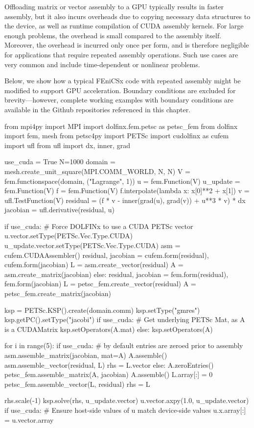 
Offloading matrix or vector assembly to a GPU typically results in faster assembly, but it also incurs overheads due to copying necessary data structures to the device, as well as runtime compilation of CUDA assembly kernels. For large enough problems, the overhead is small compared to the assembly itself. Moreover, the overhead is incurred only once per form, and is therefore negligible for applications that require repeated assembly operations. Such use cases are very common and include time-dependent or nonlinear problems.

Below, we show how a typical FEniCSx code with repeated assembly might be modified to support GPU acceleration. Boundary conditions are excluded for brevity---however, complete working examples with boundary conditions are available in the Github repositories referenced in this chapter.
\begin{python}
from mpi4py import MPI
import dolfinx.fem.petsc as petsc_fem
from dolfinx import fem, mesh
from petsc4py import PETSc
import cudolfinx as cufem
import ufl
from ufl import dx, inner, grad

use_cuda = True
N=1000
domain = mesh.create_unit_square(MPI.COMM_WORLD, N, N)
V = fem.functionspace(domain, ("Lagrange", 1))
u = fem.Function(V)
u_update = fem.Function(V)
f = fem.Function(V)
f.interpolate(lambda x: x[0]**2 + x[1])
v = ufl.TestFunction(V)
residual = (f * v - inner(grad(u), grad(v)) + u**3 * v) * dx
jacobian = ufl.derivative(residual, u)

if use_cuda:
  # Force DOLFINx to use a CUDA PETSc vector
  u.vector.setType(PETSc.Vec.Type.CUDA)
  u_update.vector.setType(PETSc.Vec.Type.CUDA)
  asm = cufem.CUDAAssembler()
  residual, jacobian = cufem.form(residual), cufem.form(jacobian)
  L = asm.create_vector(residual)
  A = asm.create_matrix(jacobian)
else:
  residual, jacobian = fem.form(residual), fem.form(jacobian)
  L = petsc_fem.create_vector(residual)
  A = petsc_fem.create_matrix(jacobian)

ksp = PETSc.KSP().create(domain.comm)
ksp.setType("gmres")
ksp.getPC().setType("jacobi")
if use_cuda:
  # Get underlying PETSc Mat, as A is a CUDAMatrix
  ksp.setOperators(A.mat)
else:
  ksp.setOperators(A)

for i in range(5):
  if use_cuda:
    # by default entries are zeroed prior to assembly
    asm.assemble_matrix(jacobian, mat=A)
    A.assemble()
    asm.assemble_vector(residual, L)
    rhs = L.vector
  else:
    A.zeroEntries()
    petsc_fem.assemble_matrix(A, jacobian)
    A.assemble()
    L.array[:] = 0
    petsc_fem.assemble_vector(L, residual)
    rhs = L

  rhs.scale(-1)
  ksp.solve(rhs, u_update.vector)
  u.vector.axpy(1.0, u_update.vector)
  if use_cuda:
    # Ensure host-side values of u match device-side values
    u.x.array[:] = u.vector.array
\end{python}

